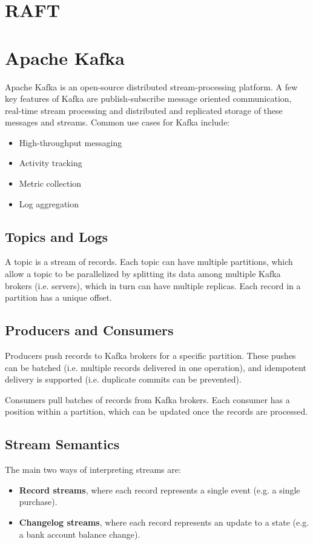 \documentclass[12pt,titlepage]{article}
\let\stdsection\section
\renewcommand\section{\clearpage\stdsection}
\begin{document}
  \section{RAFT}


  \section{Apache Kafka}
    Apache Kafka is an open-source distributed stream-processing platform. A few key features of Kafka are publish-subscribe message oriented communication,
    real-time stream processing and distributed and replicated storage of these messages and streams. Common use cases for Kafka include:
    \begin{itemize}
      \item High-throughput messaging
      \item Activity tracking
      \item Metric collection
      \item Log aggregation
    \end{itemize}

    \subsection{Topics and Logs}
      A topic is a stream of records. Each topic can have multiple partitions, which allow a topic to be parallelized by splitting its data among multiple
      Kafka brokers (i.e. servers), which in turn can have multiple replicas. Each record in a partition has a unique offset.

    \subsection{Producers and Consumers}
      Producers push records to Kafka brokers for a specific partition. These pushes can be batched (i.e. multiple records delivered in one operation), and
      idempotent delivery is supported (i.e. duplicate commits can be prevented).

      Consumers pull batches of records from Kafka brokers. Each consumer has a position within a partition, which can be updated once the records
      are processed.

    \subsection{Stream Semantics}
      The main two ways of interpreting streams are:
      \begin{itemize}
        \item \textbf{Record streams}, where each record represents a single event (e.g. a single purchase).
        \item \textbf{Changelog streams}, where each record represents an update to a state (e.g. a bank account balance change).
      \end{itemize}
\end{document}
